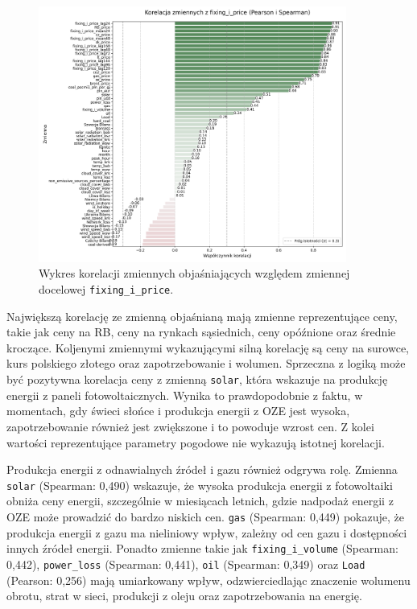 \begin{figure}[H]
    \centering
    \includegraphics[width=0.9\textwidth]{../plots/correlation_with_fixing_i_price.png}
    \caption{Wykres korelacji zmiennych objaśniających względem zmiennej docelowej \texttt{fixing\_i\_price}.}
    \label{fig:correlation_plot}
\end{figure}

Największą korelację ze zmienną objaśnianą mają zmienne reprezentujące ceny, takie jak ceny na RB, ceny na rynkach sąsiednich, ceny opóźnione oraz średnie kroczące. Koljenymi zmiennymi wykazującymi silną korelację są ceny na surowce, kurs polskiego złotego oraz zapotrzebowanie i wolumen. Sprzeczna z logiką może być pozytywna korelacja ceny z zmienną \texttt{solar}, która wskazuje na produkcję energii z paneli fotowoltaicznych. Wynika to prawdopodobnie z faktu, w momentach, gdy świeci słońce i produkcja energii z OZE jest wysoka, zapotrzebowanie również jest zwiększone i to powoduje wzrost cen. Z kolei wartości reprezentujące parametry pogodowe nie wykazują istotnej korelacji. 

Produkcja energii z odnawialnych źródeł i gazu również odgrywa rolę. Zmienna \texttt{solar} (Spearman: 0,490) wskazuje, że wysoka produkcja energii z fotowoltaiki obniża ceny energii, szczególnie w miesiącach letnich, gdzie nadpodaż energii z OZE może prowadzić do bardzo niskich cen. \texttt{gas} (Spearman: 0,449) pokazuje, że produkcja energii z gazu ma nieliniowy wpływ, zależny od cen gazu i dostępności innych źródeł energii. Ponadto zmienne takie jak \texttt{fixing\_i\_volume} (Spearman: 0,442), \texttt{power\_loss} (Spearman: 0,441), \texttt{oil} (Spearman: 0,349) oraz \texttt{Load} (Pearson: 0,256) mają umiarkowany wpływ, odzwierciedlając znaczenie wolumenu obrotu, strat w sieci, produkcji z oleju oraz zapotrzebowania na energię.

